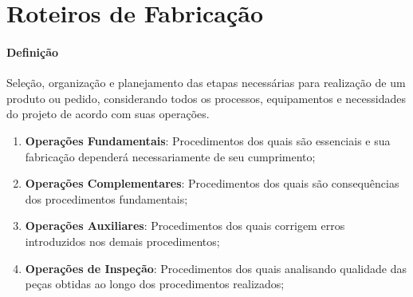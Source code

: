 \documentclass{article}
\begin{document}
    \section{Roteiros de Fabricação}
        \paragraph{Definição}Seleção, organização e planejamento das etapas necessárias para realização de um produto ou pedido, considerando todos os processos, equipamentos e necessidades do projeto de acordo com suas operações.
            \begin{enumerate}[rightmargin = \leftmargin]
                \item \textbf{Operações Fundamentais}: Procedimentos dos quais são essenciais e sua fabricação dependerá necessariamente de seu cumprimento;
                \item \textbf{Operações Complementares}: Procedimentos dos quais são consequências dos procedimentos fundamentais;
                \item \textbf{Operações Auxiliares}: Procedimentos dos quais corrigem erros introduzidos nos demais procedimentos;
                \item \textbf{Operações de Inspeção}: Procedimentos dos quais analisando qualidade das peças obtidas ao longo dos procedimentos realizados;
            \end{enumerate}
\end{document}
